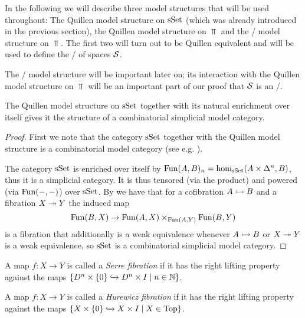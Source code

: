 In the following we will describe three model structures that will be used throughout:
The Quillen model structure on $\operatorname{sSet}$ (which was already introduced in the previous section), the Quillen model structure on $\Top$ and the \Strom/ model structure on $\Top$.
The first two will turn out to be Quillen equivalent and will be used to define the \inftycat/ of spaces $\mathcal{S}$.

The \Strom/ model structure will be important later on; its interaction with the Quillen model structure on $\Top$ will be an important part of our proof that $\mathcal{S}$ is an \inftytop/.
\begin{prop}\label{prop:sSetCombSimpModelStructure}
    The Quillen model structure on $\operatorname{sSet}$ together with its natural enrichment over itself gives it the structure of a combinatorial simplicial model category.
    \begin{proof}
        First we note that the category $\operatorname{sSet}$ together with the Quillen model structure is a combinatorial model category (see e.g. \cite[Remark 7.11.15]{cisinski_2019}).
        
        The category $\operatorname{sSet}$ is enriched over itself by $\operatorname{Fun}(A,B)_n=\hom_{\operatorname{sSet}}(A\times\Delta^n,B)$, thus it is a simplicial category.
        It is thus tensored (via the product) and powered (via $\operatorname{Fun}(-,-)$) over $\operatorname{sSet}$.
        By \cite[Corollary 1.4.5.6, Theorem 3.1.3.1 and Theorem 3.1.3.5]{kerodon} we have that for a cofibration $A\xtailrightarrow{} B$ and a fibration $X\xtwoheadrightarrow{} Y$ the induced map 
        \begin{equation*}
            \operatorname{Fun}(B,X)\to\operatorname{Fun}(A,X)\times_{\operatorname{Fun}(A,Y)}\operatorname{Fun}(B,Y)
        \end{equation*}
        is a fibration that additionally is a weak equivalence whenever $A\xtailrightarrow{} B$ or $X\xtwoheadrightarrow{} Y$ is a weak equivalence, so $\operatorname{sSet}$ is a combinatorial simplicial model category.
    \end{proof}
\end{prop}
\begin{definition}
    A map $f\colon X\to Y$ is called a \emph{Serre fibration} if it has the right lifting property against the maps $\left\lbrace D^n\times\left\lbrace0\right\rbrace\xhookrightarrow{}D^n\times I\mid n\in\mathbb{N}\right\rbrace$.
\end{definition}
\begin{definition}
    A map $f\colon X\to Y$ is called a \emph{Hurewicz fibration} if it has the right lifting property against the maps $\left\lbrace X\times\left\lbrace0\right\rbrace\xhookrightarrow{}X\times I\mid X\in\operatorname{Top}\right\rbrace$.
\end{definition}
